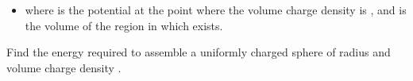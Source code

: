 \begin{ELjoin}

\begin{itemize}
\tightlist
\item
  where  is the potential at the point where the volume charge density is \ELim{\rho}, and  is the volume of the region in which \ELim{\rho} exists.
\end{itemize}


\begin{ELexample}{}

Find the energy required to assemble a uniformly charged sphere of radius  and volume charge density \ELim{\rho}.

\begin{ELsolution}


\end{ELsolution}

\end{ELexample}

\end{ELjoin}

